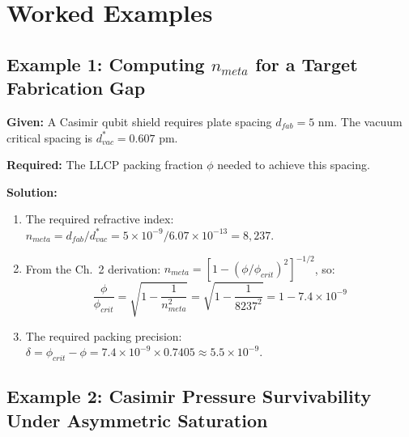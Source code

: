 \section{Worked Examples}
\label{sec:worked_examples}

\subsection{Example 1: Computing $n_{meta}$ for a Target Fabrication Gap}

\begin{examplebox}
\textbf{Given:} A Casimir qubit shield requires plate spacing $d_{fab} = 5$ nm. The vacuum critical spacing is $d^*_{vac} = 0.607$ pm.

\textbf{Required:} The LLCP packing fraction $\phi$ needed to achieve this spacing.

\textbf{Solution:}
\begin{enumerate}
    \item The required refractive index: $n_{meta} = d_{fab} / d^*_{vac} = 5 \times 10^{-9} / 6.07 \times 10^{-13} = 8{,}237$.
    \item From the Ch.~2 derivation: $n_{meta} = [1 - (\phi/\phi_{crit})^2]^{-1/2}$, so:
    \[
        \frac{\phi}{\phi_{crit}} = \sqrt{1 - \frac{1}{n_{meta}^2}} = \sqrt{1 - \frac{1}{8237^2}} = 1 - 7.4 \times 10^{-9}
    \]
    \item The required packing precision: $\delta = \phi_{crit} - \phi = 7.4 \times 10^{-9} \times 0.7405 \approx 5.5 \times 10^{-9}$.
\end{enumerate}
\end{examplebox}

\subsection{Example 2: Casimir Pressure Survivability Under Asymmetric Saturation}


